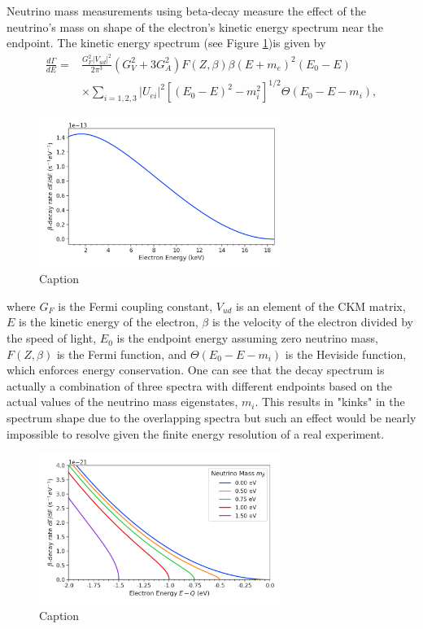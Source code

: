 Neutrino mass measurements using beta-decay measure the effect of the neutrino's mass on shape of the electron's kinetic energy spectrum near the endpoint. The kinetic energy spectrum (see Figure \ref{fig:chap2-tritium-spectrum})is given by 
\begin{equation}
\begin{split}
    \frac{d\Gamma}{dE}=&\frac{G_F^2|V_{ud}|^2}{2\pi^3}(G_V^2+3G_A^2)F(Z,\beta)\beta(E+m_e)^2(E_0-E)\\
    &\times \sum_{i=1,2,3}{|U_{ei}|^2[(E_0-E)^2-m_i^2]^{1/2}\Theta(E_0-E-m_i)},
\end{split}
\end{equation}
\begin{figure}[htbp]
    \centering
    \includegraphics[width=0.7\textwidth]{figs/Chapter-2/230302_atomic_tritium_spectrum.png}
    \caption{Caption}
    \label{fig:chap2-tritium-spectrum}
\end{figure}
where $G_F$ is the Fermi coupling constant, $V_{ud}$ is an element of the CKM matrix, $E$ is the kinetic energy of the electron, $\beta$ is the velocity of the electron divided by the speed of light, $E_0$ is the endpoint energy assuming zero neutrino mass, $F(Z,\beta)$ is the Fermi function, and $\Theta(E_0-E-m_i)$ is the Heviside function, which enforces energy conservation. One can see that the decay spectrum is actually a combination of three spectra with different endpoints based on the actual values of the neutrino mass eigenstates, $m_i$. This results in "kinks" in the spectrum shape due to the overlapping spectra but such an effect would be nearly impossible to resolve given the finite energy resolution of a real experiment. 

\begin{figure}[htbp]
    \centering
    \includegraphics[width=0.7\textwidth]{figs/Chapter-2/230302_atomic_tritium_spectrum_near_endpoint.png}
    \caption{Caption}
    \label{fig:chap2-atomic-tritium-endpoint}
\end{figure}

